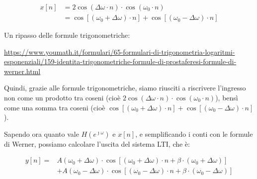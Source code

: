 {
    \Large 
    \begin{equation}
        \begin{split}
            x \left[ n \right] 
            &= 
            2 \cos(\Delta \omega \cdot n) \cdot \cos(\omega_0 \cdot n)
            \\
            &= 
            \cos \left[ \left(\omega_0 + \Delta \omega\right) \cdot n\right]
            + 
            \cos \left[ \left(\omega_0 - \Delta \omega\right) \cdot n\right]
        \end{split}
    \end{equation}
}
\begin{tcolorbox}
    Un ripasso delle formule trigonometriche: \newline 

    \url{https://www.youmath.it/formulari/65-formulari-di-trigonometria-logaritmi-esponenziali/159-identita-trigonometriche-formule-di-prostaferesi-formule-di-werner.html}
\end{tcolorbox}

Quindi, grazie alle formule trigonometriche, siamo riusciti a riscrivere l'ingresso non come un prodotto tra coseni (cioè $2 \cos(\Delta \omega \cdot n) \cdot \cos(\omega_0 \cdot n)$), 
bensì come una somma tra coseni (cioè $\cos \left[ \left(\omega_0 + \Delta \omega\right) \cdot n\right] + \cos \left[ \left(\omega_0 - \Delta \omega\right) \cdot n\right]$). \newline 

\newpage 

Sapendo ora quanto vale $H \left(e^{\jmath \omega}\right)$ e $x \left[ n\right]$, e semplificando i conti con le formule di Werner, 
possiamo calcolare l'uscita del sistema LTI, che è: 

{
    \Large 
    \begin{equation}
        \begin{split}
        y \left[ n\right] 
        = 
        &A \left(\omega_0 + \Delta \omega\right) 
        \cdot 
        \cos 
        \left[
            \left(
                \omega_0 + \Delta \omega
            \right)
            \cdot 
            n
            + 
            \beta 
            \cdot 
            \left(
                \omega_0 + \Delta \omega
            \right)
        \right]
        \\
        &+
        A \left(\omega_0 - \Delta \omega\right) 
        \cdot 
        \cos 
        \left[
            \left(
                \omega_0 - \Delta \omega
            \right)
            \cdot 
            n
            + 
            \beta 
            \cdot 
            \left(
                \omega_0 - \Delta \omega
            \right)
        \right]    
        \end{split}
        \end{equation}
}

